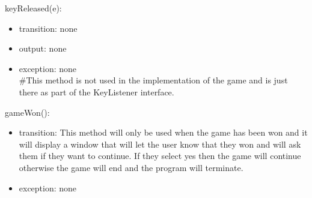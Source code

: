 \documentclass[12pt]{article}
\begin{document}
\noindent keyReleased(e):
\begin{itemize}
\item transition: none 
\item output: none
\item exception: none\\
\#This method is not used in the implementation of the game and is just there as part of the KeyListener interface.
\end{itemize}

\noindent gameWon():
\begin{itemize}
\item transition: This method will only be used when the game has been won and it will display a window that will let the user know that they won and will ask them if they want to continue. If they select yes then the game will continue otherwise the game will end and the program will terminate.
\item exception: none
\end{itemize}

\newpage 
\end{document}
